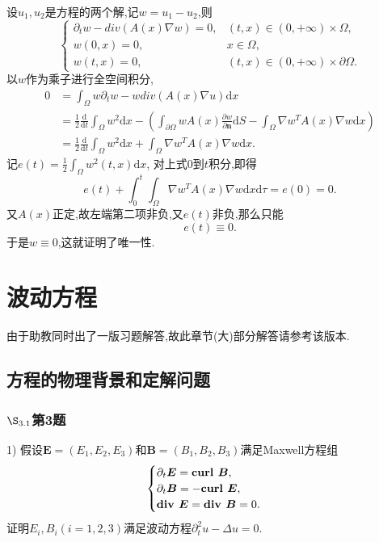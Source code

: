 \documentclass[12pt, a4paper]{ctexbook}
\newcommand{\curl}{\text{\bf curl }}
\newcommand{\dx}{\text{d}x}
\newcommand{\dS}{\text{d}S}
\newcommand{\dt}{\text{d}t}
\renewcommand{\d}{\text{d}}
\begin{document}
    设$u_1,u_2$是方程的两个解,记$w = u_1-u_2$,则
    \begin{equation*}
    \begin{cases}
    \partial_t w - div(A(x) \nabla w) = 0, &(t,x) \in (0,+\infty) \times \Omega,\\
    w(0,x) = 0,&x \in \Omega,\\
    w(t,x) = 0, &(t,x) \in (0,+\infty) \times \partial \Omega.
    \end{cases}
    \end{equation*}
    以$w$作为乘子进行全空间积分,
    \begin{align*}
    0&=\int_{\Omega} w\partial_t w -w div(A(x) \nabla u) \dx\\
    &=\frac12 \frac{\d}{\dt}\int_{\Omega} w^2\dx - \left(\int_{\partial \Omega} wA(x) \frac{\partial w}{\partial \bm{n}}\dS - \int_{\Omega}\nabla w^T A(x) \nabla w \dx \right)\\
    &=\frac12 \frac{\d}{\dt}\int_{\Omega} w^2\dx + \int_{\Omega}\nabla w^T A(x) \nabla w \dx.
    \end{align*}
    记$e(t) = \frac12\int_{\Omega}w^2(t,x) \dx$,  对上式0到$t$积分,即得
    \begin{equation*}
    e(t) + \int_0^t\int_{\Omega}\nabla w^T A(x) \nabla w \dx \d\tau = e(0) = 0.
    \end{equation*}
    又$A(x)$正定,故左端第二项非负,又$e(t)$非负,那么只能
    \begin{equation*}
    e(t) \equiv 0.
    \end{equation*}
    于是$w\equiv0$,这就证明了唯一性.
    
    
    
    \chapter{波动方程}
    
    由于助教同时出了一版习题解答,故此章节(大)部分解答请参考该版本.
    
    \section{方程的物理背景和定解问题}
    
    
    \subsection{$\S_{3.1}$第3题}
    \kaishu{}
    
    1) 假设$\bm E = (E_1, E_2, E_3)$和$\bm B = (B_1, B_2, B_3)$满足Maxwell方程组
    $$ \begin{cases}
    \partial_t \bm E = \curl \bm B,\\
    \partial_t \bm B = -\curl \bm E,\\
    \text{\bf div } \bm E = \text{\bf div } \bm B = 0.
    \end{cases}$$
    证明$E_i, B_i (i=1,2,3)$满足波动方程$\partial_t^2u-\Delta u = 0$.
    
\end{document}

